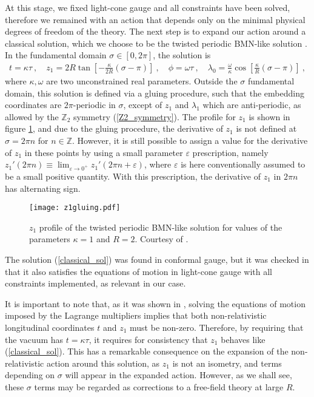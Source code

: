 \documentclass[12pt]{article}
\numberwithin{equation}{section}
\begin{document}
At this stage, we fixed light-cone gauge and all constraints have been solved, therefore we remained with an action that depends only on the minimal physical degrees of freedom of the theory. The next step is to expand our action around a classical solution, which we choose to be the twisted periodic BMN-like solution \cite{Fontanella:2021btt}. In the fundamental domain $\sigma \in [0, 2 \pi]$, the solution is
\begin{eqnarray}
\label{classical_sol}
    t= \kappa \tau \ , \quad
    z_1 = 2R \tan \left[ -\frac{\kappa}{2 R} (\sigma-\pi) \right] \ , \quad
    \phi = \omega \tau \ , \quad
    \lambda_0 = \frac{\omega}{\kappa}\cos \left[ \frac{\kappa}{R} (\sigma-\pi) \right] \ ,
\end{eqnarray}
where $\kappa, \omega$ are two unconstrained real parameters.
Outside the $\sigma$ fundamental domain, this solution is defined via a gluing procedure, such that the embedding coordinates are $2\pi$-periodic in $\sigma$, except of $z_1$ and $\lambda_1$ which are anti-periodic, as allowed by the $\mathbb{Z}_2$ symmetry (\ref{Z2_symmetry}). The profile for $z_1$ is shown in figure \ref{z1gluing}, and due to the gluing procedure, the derivative of $z_1$ is not defined at $\sigma = 2\pi n$ for $n \in \mathbb{Z}$. However, it is still possible to assign a value for the derivative of $z_1$ in these points by using a small parameter $\varepsilon$ prescription, namely $z_1' (2 \pi n) \equiv \lim_{\varepsilon \rightarrow 0^+} z_1'(2 \pi n  + \varepsilon)$, where $\varepsilon$ is here conventionally assumed to be a small positive quantity. With this prescription, the derivative of $z_1$ in $2\pi n$ has alternating sign. 
\begin{figure}[t]
\begin{center}
 \texttt{[image: z1gluing.pdf]}
\end{center}
\caption{$z_1$ profile of the twisted periodic BMN-like solution for values of the parameters $\kappa = 1$ and $R=2$. Courtesy of  \cite{Fontanella:2021btt}.} 
\label{z1gluing}
\end{figure} 
The solution (\ref{classical_sol}) was found in conformal gauge, but it was checked in \cite{Fontanella:2021btt} that it also satisfies the 
equations of motion in light-cone gauge with all constraints implemented, as relevant in our case. 





It is important to note that, as it was shown in \cite{Fontanella:2021btt}, solving the equations of motion imposed by the Lagrange multipliers implies that both non-relativistic longitudinal coordinates $t$ and $z_1$ must be non-zero. Therefore, by requiring that the vacuum has $t= \kappa \tau$, it requires for consistency that $z_1$ behaves like (\ref{classical_sol}). This has a remarkable consequence on the expansion of the non-relativistic action around this solution, as $z_1$ is not an isometry, and terms depending on $\sigma$ will appear in the expanded action. However, as we shall see, these $\sigma$ terms may be regarded as corrections to a free-field theory at large $R$. 
\end{document}
